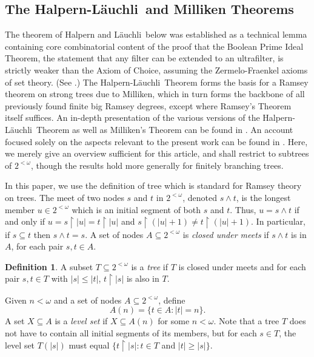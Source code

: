 \documentclass{amsart}
\theoremstyle{remark}
\theoremstyle{definition}
\newtheorem{defn}[thm]{Definition}
\theoremstyle{remark}
\newcommand{\om}{\omega}
\newcommand{\sse}{\subseteq}
\newcommand{\re}{\restriction}
\newcommand{\Lauchli}{L{\"{a}}uchli}
\begin{document}
\subsection{The Halpern-\Lauchli\ and Milliken Theorems}\label{subsection.HLM}


The theorem of Halpern and \Lauchli\ below
was  established
as
 a technical lemma  containing core combinatorial content  of the
proof that
 the Boolean Prime Ideal Theorem, the statement that any filter can be extended to an ultrafilter, is strictly weaker than the Axiom of Choice, assuming  the Zermelo-Fraenkel axioms of set theory.
(See  \cite{Halpern/Levy71}.)
The Halpern-\Lauchli\ Theorem forms the basis for a Ramsey theorem on  strong trees due to Milliken, which in turn
 forms the backbone of all previously found
finite big Ramsey degrees, except where Ramsey's Theorem itself suffices.
An in-depth presentation of the various versions of the Halpern-\Lauchli\ Theorem as well as Milliken's Theorem can be found in  \cite{TodorcevicBK10}.
An account focused solely on
the aspects  relevant to  the present work can be found in \cite{DobrinenRIMS17}.
Here, we merely give an overview sufficient for this article, and shall restrict to subtrees of $2^{<\om}$, though the results hold more generally for  finitely branching trees.


In  this paper,
we use the  definition of tree which is standard for  Ramsey theory on trees.
The meet of two nodes $s$ and $t$ in $2^{<\om}$, denoted $s\wedge t$,
is the longest member $u\in 2^{<\om}$ which is an initial segment of both $s$ and $t$.
Thus, $u=s\wedge t$ if and only if $u=s\re|u|=t\re|u|$ and $s \re (|u|+1)\ne t\re (|u|+1)$.
In particular, if $s\sse t$ then $s\wedge t=s$.
A set  of nodes $A\sse 2^{<\om}$ is {\em closed under meets}
if $s\wedge t$ is in $A$, for each pair $s,t\in A$.


\begin{defn}\label{defn.tree}
A  subset $T\sse 2^{<\om}$  is a {\em tree}
if $T$
 is closed under meets and  for each pair $s,t\in T$
with $|s|\le |t|$,
$t\re |s|$ is also in $T$.
\end{defn}


Given $n<\om$ and a set of nodes $A\sse 2^{<\om}$, define
 \begin{equation}
A(n)=\{t\in A:|t|=n\}.
\end{equation}
A set $X\sse A$ is a {\em level set}
 if $X\sse A(n)$ for some  $n<\om$.
Note that a  tree $T$ does not have to contain all   initial segments  of its members, but for each $s\in T$, the level set $T(|s|)$ must equal $\{t\re |s|:t\in T$ and $|t|\ge |s|\}$.
\end{document}
